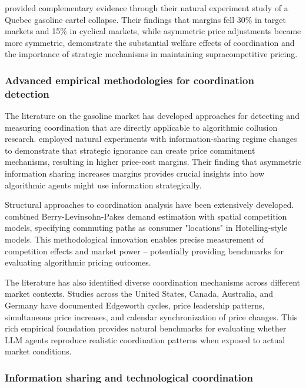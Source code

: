 \textcite{clark_effect_2014} provided complementary evidence through their natural experiment study of a Quebec gasoline cartel collapse. Their findings that margins fell 30\% in target markets and 15\% in cyclical markets, while asymmetric price adjustments became more symmetric, demonstrate the substantial welfare effects of coordination and the importance of strategic mechanisms in maintaining supracompetitive pricing.

\subsubsection*{Advanced empirical methodologies for coordination detection}

The literature on the gasoline market has developed approaches for detecting and measuring coordination that are directly applicable to algorithmic collusion research. \textcite{byrne_learning_2019} employed natural experiments with information-sharing regime changes to demonstrate that strategic ignorance can create price commitment mechanisms, resulting in higher price-cost margins. Their finding that asymmetric information sharing increases margins provides crucial insights into how algorithmic agents might use information strategically.

Structural approaches to coordination analysis have been extensively developed. \textcite{houde_spatial_2012} combined Berry-Levinsohn-Pakes demand estimation with spatial competition models, specifying commuting paths as consumer "locations" in Hotelling-style models. This methodological innovation enables precise measurement of competition effects and market power -- potentially providing benchmarks for evaluating algorithmic pricing outcomes.

The literature has also identified diverse coordination mechanisms across different market contexts. Studies across the United States, Canada, Australia, and Germany have documented Edgeworth cycles, price leadership patterns, simultaneous price increases, and calendar synchronization of price changes. This rich empirical foundation provides natural benchmarks for evaluating whether LLM agents reproduce realistic coordination patterns when exposed to actual market conditions.

\subsubsection*{Information sharing and technological coordination}


